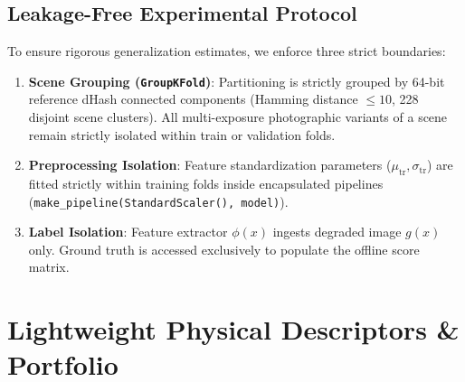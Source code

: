 \documentclass[journal]{IEEEtran}
\begin{document}
\subsection{Leakage-Free Experimental Protocol}
To ensure rigorous generalization estimates, we enforce three strict boundaries:
\begin{enumerate}
    \setlength{\itemsep}{1pt}
    \setlength{\parskip}{0pt}
    \item \textbf{Scene Grouping (\texttt{GroupKFold})}: Partitioning is strictly grouped by 64-bit reference dHash connected components (Hamming distance $\le 10$, 228 disjoint scene clusters). All multi-exposure photographic variants of a scene remain strictly isolated within train or validation folds.
    \item \textbf{Preprocessing Isolation}: Feature standardization parameters ($\mu_{\text{tr}}, \sigma_{\text{tr}}$) are fitted strictly within training folds inside encapsulated pipelines (\texttt{make\_pipeline(StandardScaler(), model)}).
    \item \textbf{Label Isolation}: Feature extractor $\phi(x)$ ingests degraded image $g(x)$ only. Ground truth is accessed exclusively to populate the offline score matrix.
\end{enumerate}

\section{Lightweight Physical Descriptors \& Portfolio}
\end{document}
